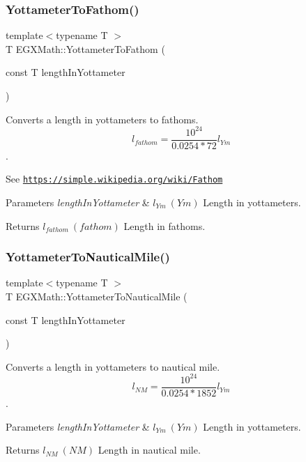 \subsubsection{\texorpdfstring{Yottameter\+To\+Fathom()}{YottameterToFathom()}}
{\footnotesize\ttfamily template$<$typename T $>$ \\
T E\+G\+X\+Math\+::\+Yottameter\+To\+Fathom (\begin{DoxyParamCaption}\item[{const T}]{length\+In\+Yottameter }\end{DoxyParamCaption})}



Converts a length in yottameters to fathoms. \[ l_{fathom}= \frac{10^{24}}{0.0254 * 72} l_{Ym} \]. 

See \href{https://simple.wikipedia.org/wiki/Fathom}{\tt https\+://simple.\+wikipedia.\+org/wiki/\+Fathom} 
\begin{DoxyParams}{Parameters}
{\em length\+In\+Yottameter} & $ l_{Ym}\ (Ym)$ Length in yottameters. \\
\hline
\end{DoxyParams}
\begin{DoxyReturn}{Returns}
$ l_{fathom}\ (fathom)$ Length in fathoms. 
\end{DoxyReturn}
\mbox{\label{group___e_g_x_math-_conversions-_length_conversions-_yottameter-_nautical_ga455b7f16dd9ff68f759f366def111300}} 
\subsubsection{\texorpdfstring{Yottameter\+To\+Nautical\+Mile()}{YottameterToNauticalMile()}}
{\footnotesize\ttfamily template$<$typename T $>$ \\
T E\+G\+X\+Math\+::\+Yottameter\+To\+Nautical\+Mile (\begin{DoxyParamCaption}\item[{const T}]{length\+In\+Yottameter }\end{DoxyParamCaption})}



Converts a length in yottameters to nautical mile. \[ l_{NM}= \frac{10^{24}}{0.0254 * 1852} l_{Ym} \]. 


\begin{DoxyParams}{Parameters}
{\em length\+In\+Yottameter} & $ l_{Ym}\ (Ym)$ Length in yottameters. \\
\hline
\end{DoxyParams}
\begin{DoxyReturn}{Returns}
$ l_{NM}\ (NM)$ Length in nautical mile. 
\end{DoxyReturn}
